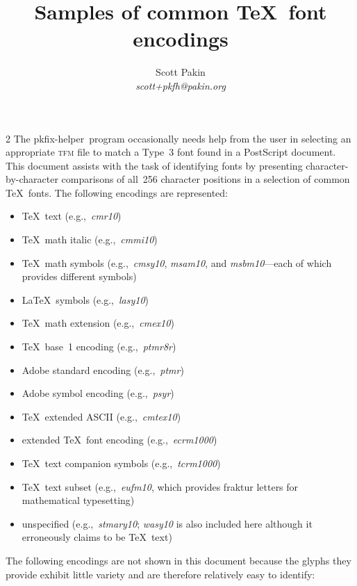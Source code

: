 \documentclass{article}
\title{Samples of common \TeX\ font encodings}
\author{Scott Pakin \\ \textit{scott+pkfh@pakin.org}}
\newcommand*{\pkfh}{\mbox{\textsf{pkfix-helper}}}
\newcommand*{\fname}[1]{\mbox{\textit{#1}}}
\begin{document}
\maketitle

\begin{multicols}{2}
The \pkfh\ program occasionally needs help from the user in selecting
an appropriate \textsc{tfm} file to match a Type~3 font found in a
PostScript document.  This document assists with the task of
identifying fonts by presenting character-by-character comparisons of
all~256 character positions in a selection of common \TeX\ fonts.  The
following encodings are represented:

\begin{itemize}
  \item \TeX\ text (e.g.,~\fname{cmr10})
  \item \TeX\ math italic (e.g.,~\fname{cmmi10})
  \item \TeX\ math symbols (e.g.,~\fname{cmsy10}, \fname{msam10}, and
    \fname{msbm10}---each of which provides different symbols)
  \item \LaTeX\ symbols (e.g.,~\fname{lasy10})
  \item \TeX\ math extension (e.g.,~\fname{cmex10})
  \item \TeX\ base~1 encoding (e.g.,~\fname{ptmr8r})
  \item Adobe standard encoding (e.g.,~\fname{ptmr})
  \item Adobe symbol encoding (e.g.,~\fname{psyr})
  \item \TeX\ extended ASCII (e.g.,~\fname{cmtex10})
  \item extended \TeX\ font encoding (e.g.,~\fname{ecrm1000})
  \item \TeX\ text companion symbols (e.g.,~\fname{tcrm1000})
  \item \TeX\ text subset (e.g.,~\fname{eufm10}, which provides fraktur
    letters for mathematical typesetting)
  \item unspecified (e.g.,~\fname{stmary10}; \fname{wasy10} is
    also included here although it erroneously claims to be \TeX\ text)
\end{itemize}

The following encodings are not shown in this document because the
glyphs they provide exhibit little variety and are therefore
relatively easy to identify:


\end{multicols}
\end{document}
